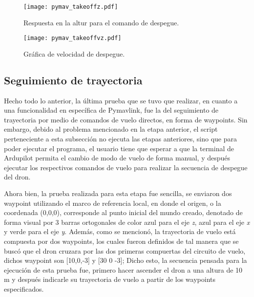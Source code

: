 \begin{figure}[ht]
    \centering
    \texttt{[image: pymav\_takeoffz.pdf]}
    \caption{Respuesta en la altur para el comando de despegue.}
    \label{fig:pymav_takeoffz}
\end{figure}

\begin{figure}[ht]
    \centering
    \texttt{[image: pymav\_takeoffvz.pdf]}
    \caption{Gráfica de velocidad de despegue.}
    \label{fig:pymav_takeoffvz}
\end{figure}

\newpage

\subsection{Seguimiento de trayectoria}

Hecho todo lo anterior, la última prueba que se tuvo que realizar, en cuanto a una funcionalidad en específica de Pymavlink, fue la del seguimiento de trayectoria por medio de comandos de vuelo directos, en forma de waypoints. Sin embargo, debido al problema mencionado en la etapa anterior, el script perteneciente a esta subsección no ejecuta las etapas anteriores, sino que para poder ejecutar el programa, el usuario tiene que esperar a que la terminal de Ardupilot permita el cambio de modo de vuelo de forma manual, y después ejecutar los respectivos comandos de vuelo para realizar la secuencia de despegue del dron.

Ahora bien, la prueba realizada para esta etapa fue sencilla, se enviaron dos waypoint utilizando el marco de referencia local, en donde el origen, o la coordenada (0,0,0), corresponde al punto inicial del mundo creado, denotado de forma visual por 3 barras ortogonales de color azul para el eje \textit{z}, azul para el eje \textit{x} y verde para el eje \textit{y}. Además, como se mencionó, la trayectoria de vuelo está compuesta por dos waypoints, los cuales fueron definidos de tal manera que se buscó que el dron cruzara por las dos primeras compuertas del circuito de vuelo, dichos waypoint son [10,0,-3] y [30 0 -3]; Dicho esto, la secuencia pensada para la ejecución de esta prueba fue, primero hacer ascender el dron a una altura de 10 m y después indicarle su trayectoria de vuelo a partir de los waypoints especificados. 

